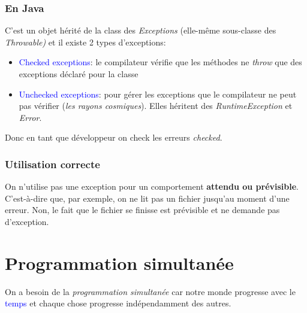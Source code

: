 \documentclass{report}
\begin{document}
\subsection{En Java}
C'est un objet hérité de la class des \textit{Exceptions} (elle-même sous-classe des \textit{Throwable)} et il existe 2 types d'exceptions:
\begin{itemize}
\item \textcolor{blue}{Checked exceptions}: le compilateur vérifie que les méthodes ne \textit{throw} que des exceptions déclaré pour la classe
\item \textcolor{blue}{Unchecked exceptions}: pour gérer les exceptions que le compilateur ne peut pas vérifier (\textit{les rayons cosmiques}). Elles héritent des \textit{RuntimeException} et \textit{Error}.
\end{itemize}
Donc en tant que développeur on check les erreurs \textit{checked}.

\subsection{Utilisation correcte}
On n'utilise pas une exception pour un comportement \textbf{attendu ou prévisible}. C'est-à-dire que, par exemple, on ne lit pas un fichier jusqu'au moment d'une erreur. Non, le fait que le fichier se finisse est prévisible et ne demande pas d'exception.


\chapter{Programmation simultanée}
On a besoin de la \textit{programmation simultanée} car notre monde progresse avec le \textcolor{blue}{temps} et chaque chose progresse indépendamment des autres.
\end{document}
